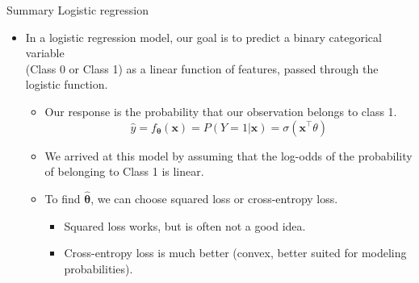\documentclass[aspectratio=169]{../latex_main/tntbeamer}  %
\begin{document}
	\begin{frame}{Summary Logistic regression}
	    \begin{itemize}
	        \item In a logistic regression model, our goal is to predict a binary categorical variable\\ (Class 0 or Class 1) as a linear function of features, passed through the logistic function.
	        \begin{itemize}
	            \item Our response is the probability that our observation belongs to class 1.
	            \begin{equation*}
	                \hat{y} = f_{\bm{\theta}}(\bm{x}) = P(Y=1|\bm{x}) = \sigma (\bm{x}^\intercal\theta)
	            \end{equation*}
	            \item We arrived at this model by assuming that the log-odds of the probability of belonging to Class 1 is linear.
	            \item To find  $\hat{\bm{\theta}}$, we can choose squared loss or cross-entropy loss.
                \begin{itemize}
                    \item Squared loss works, but is often not a good idea.
                    \item Cross-entropy loss is much better (convex, better suited for modeling probabilities).
                \end{itemize}
	        \end{itemize}
	    \end{itemize}
	\end{frame}
	
\end{document}
